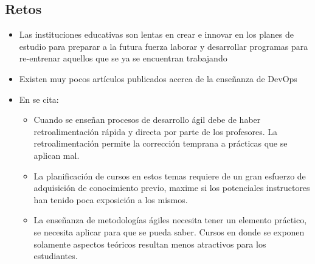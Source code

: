 \documentclass[journal]{IEEEtran}
\begin{document}
\subsection{Retos} \label{sec:retos}
\begin{itemize}

    \item Las instituciones educativas son lentas en crear e innovar en los planes de estudio para preparar a la futura fuerza laborar y desarrollar programas para re-entrenar aquellos que se ya se encuentran trabajando \cite{cenfotec-2}
    \item Existen muy pocos artículos publicados acerca de la enseñanza de DevOps\cite{henrik-b}
    \item En \cite{steghoger-et-al} se cita:
        \begin{itemize}
            \item Cuando se enseñan procesos de desarrollo ágil debe de haber retroalimentación rápida y directa por parte de los profesores. La retroalimentación permite la corrección temprana a prácticas que se aplican mal.
            \item La planificación de cursos en estos temas requiere de un gran esfuerzo de adquisición de conocimiento previo, maxime si los potenciales instructores han tenido poca exposición a los mismos.
            \item La enseñanza de metodologías ágiles necesita tener un elemento práctico, se necesita aplicar para que se pueda saber. Cursos en donde se exponen solamente aspectos teóricos resultan menos atractivos para los estudiantes. 
        \end{itemize} 
        

\end{itemize}
\end{document}
